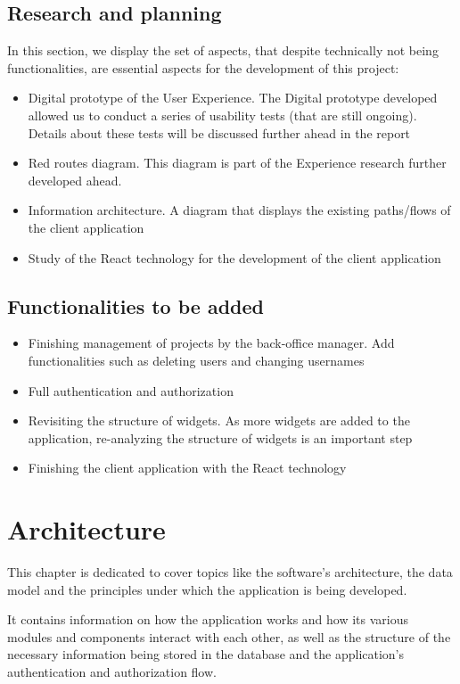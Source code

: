 \documentclass[a4paper,twoside,10pt]{report}
\begin{document}
\section{Research and planning}
In this section, we display the set of aspects, that despite technically not being functionalities, are essential aspects for the development of this project:

\begin{itemize}
    \item Digital prototype of the User Experience. The Digital prototype developed allowed us to conduct a series of usability tests (that are still ongoing). Details about these tests will be discussed further ahead in the report
    \item Red routes diagram. This diagram is part of the Experience research further developed ahead.
    \item Information architecture\cite{INFOARCH}. A diagram that displays the existing paths/flows of the client application
    \item Study of the React\cite{REACT} technology for the development of the client application
\end{itemize}

\section{Functionalities to be added}
\begin{itemize}
    \item Finishing management of projects by the back-office manager. Add functionalities such as deleting users and changing usernames
    \item Full authentication and authorization
    \item Revisiting the structure of widgets. As more widgets are added to the application, re-analyzing the structure of widgets is an important step
    \item Finishing the client application with the React technology 
\end{itemize}

\chapter{Architecture}
This chapter is dedicated to cover topics like the software's architecture, the data model and the principles under which the application is being developed. 

It contains information on how the application works and how its various modules and components interact with each other, as well as the structure of the necessary information being stored in the database and the application's authentication and authorization flow.
\end{document}
